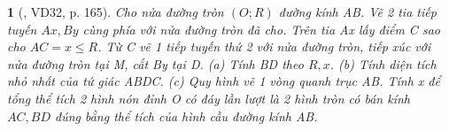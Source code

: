 \documentclass{article}
\newtheorem{baitoan}{}
\begin{document}
\begin{baitoan}[\cite{Tuyen_Toan_9_old}, VD32, p. 165]
	Cho nửa đường tròn $(O;R)$ đường kính AB. Vẽ 2 tia tiếp tuyến $Ax,By$ cùng phía với nửa đường tròn đã cho. Trên tia Ax lấy điểm C sao cho $AC = x\le R$. Từ C vẽ 1 tiếp tuyến thứ 2 với nửa đường tròn, tiếp xúc với nửa đường tròn tại M, cắt By tại D. (a) Tính BD theo $R,x$. (b) Tính diện tích nhỏ nhất của tứ giác ABDC. (c) Quy hình vẽ 1 vòng quanh trục AB. Tính x để tổng thể tích 2 hình nón đỉnh O có đáy lần lượt là 2 hình tròn có bán kính $AC,BD$ đúng bằng thể tích của hình cầu đường kính AB.
\end{baitoan}


\printbibliography[heading=bibintoc]
	
\end{document}
